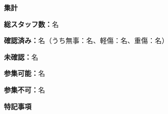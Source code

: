 \documentclass[a4paper,12pt]{jarticle}
\newcommand{\underlinespace}[1]{\underline{\hspace{#1}}}
\begin{document}
\begin{center}
\textbf{\large 集計}
\end{center}

\vspace{3mm}

\noindent
\textbf{総スタッフ数：}\underlinespace{2cm}名

\vspace{2mm}

\noindent
\textbf{確認済み：}\underlinespace{2cm}名（うち無事：\underlinespace{1.5cm}名、軽傷：\underlinespace{1.5cm}名、重傷：\underlinespace{1.5cm}名）

\vspace{2mm}

\noindent
\textbf{未確認：}\underlinespace{2cm}名

\vspace{2mm}

\noindent
\textbf{参集可能：}\underlinespace{2cm}名

\vspace{2mm}

\noindent
\textbf{参集不可：}\underlinespace{2cm}名

\vspace{8mm}

\begin{center}
\textbf{\large 特記事項}
\end{center}

\vspace{3mm}

\noindent
\underlinespace{13cm}

\vspace{3mm}

\noindent
\underlinespace{13cm}

\vspace{3mm}

\noindent
\underlinespace{13cm}

\vspace{3mm}

\noindent
\underlinespace{13cm}

\vspace{3mm}

\noindent
\underlinespace{13cm}
\end{document}
